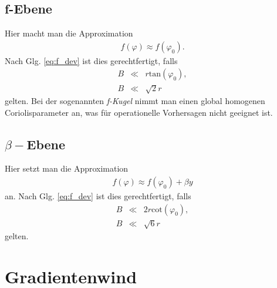 \documentclass{book}
\renewcommand{\tan}{\text{tan}}
\renewcommand{\cot}{\text{cot}}
\begin{document}
\subsection{f-Ebene}
\label{sec:febene}

Hier macht man die Approximation
%
\begin{eqnarray}
f\left(\varphi\right) \approx f\left(\varphi_0\right).
\end{eqnarray}
%
Nach Glg. \eqref{eq:f_dev} ist dies gerechtfertigt, falls
%
\begin{eqnarray}
B & \ll & r\tan\left(\varphi_0\right),\\
B & \ll & \sqrt{2}r
\end{eqnarray}
%
gelten. Bei der sogenannten \textit{f-Kugel} nimmt man einen global homogenen Coriolisparameter an, was für operationelle Vorhersagen nicht geeignet ist.

\subsection{$\beta-$Ebene}
\label{sec:betaebene}

Hier setzt man die Approximation
%
\begin{eqnarray}
f\left(\varphi\right) \approx f\left(\varphi_0\right) + \beta y
\end{eqnarray}
%
an. Nach Glg. \eqref{eq:f_dev} ist dies gerechtfertigt, falls
%
\begin{eqnarray}
B & \ll & 2r\cot\left(\varphi_0\right),\\
B & \ll & \sqrt{6}r
\end{eqnarray}
%
gelten.

\section{Gradientenwind}
\label{sec:gradientenwind}
\end{document}
